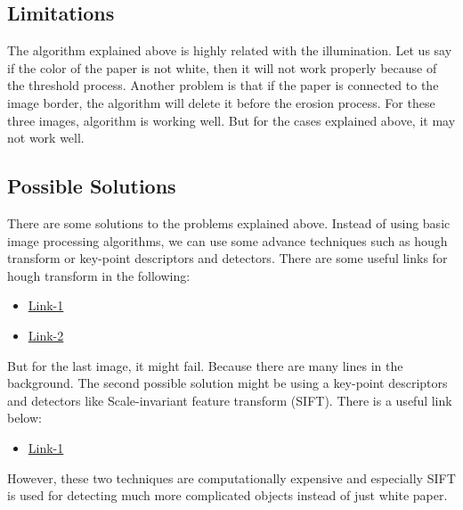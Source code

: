 \documentclass[paper=a4, fontsize=10pt]{scrartcl} %
\numberwithin{equation}{section} %
\numberwithin{figure}{section} %
\begin{document}
\subsection{Limitations}

The algorithm explained above is highly related with the illumination. Let us say if the color of the paper is not white, then it will not work properly because of the threshold process. Another problem is that if the paper is connected to the image border, the algorithm will delete it before the erosion process. For these three images, algorithm is working well. But for the cases explained above, it may not work well.

\subsection{Possible Solutions}

There are some solutions to the problems explained above. Instead of using basic image processing algorithms, we can use some advance techniques such as hough transform or key-point descriptors and detectors. There are some useful links for hough transform in the following:

\begin{itemize}
	\item \href{http://www.imagemagick.org/discourse-server/viewtopic.php?t=25476}{Link-1}
	\item \href{http://stackoverflow.com/questions/10533233/opencv-c-obj-c-advanced-square-detection}{Link-2}
\end{itemize}

But for the last image, it might fail. Because there are many lines in the background. The second possible solution might be using a key-point descriptors and detectors like Scale-invariant feature transform (SIFT). There is a useful link below:

\begin{itemize}
	\item \href{http://opencv-python-tutroals.readthedocs.io/en/latest/py_tutorials/py_feature2d/py_feature_homography/py_feature_homography.html}{Link-1}
\end{itemize}

However, these two techniques are computationally expensive and especially SIFT is used for detecting much more complicated objects instead of just white paper.

\end{document}
